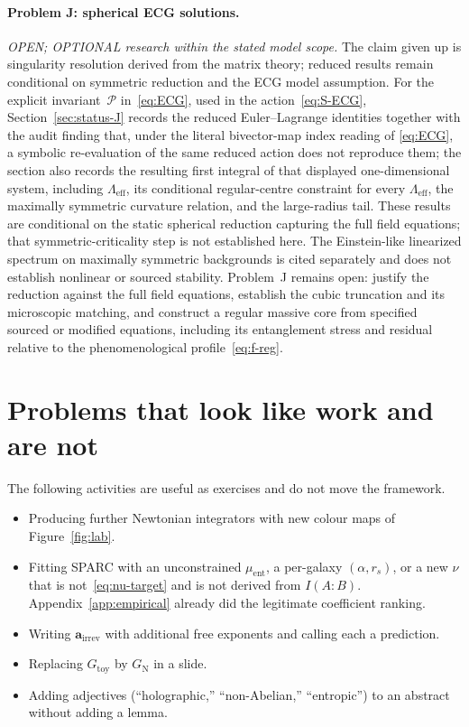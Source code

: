 \paragraph{Problem J: spherical ECG solutions.}
\emph{OPEN; OPTIONAL research within the stated model scope.} The
claim given up is singularity resolution derived from the matrix
theory; reduced results remain conditional on symmetric reduction
and the ECG model assumption.
For the explicit invariant~\(\mathcal P\) in~\eqref{eq:ECG}, used in
the action~\eqref{eq:S-ECG}, Section~\ref{sec:status-J} records the
reduced Euler--Lagrange identities together with the audit finding
that, under the literal bivector-map index reading of \eqref{eq:ECG},
a symbolic re-evaluation of the same reduced action does not
reproduce them; the section also records the resulting first integral
of that displayed one-dimensional system, including
\(\Lambda_{\mathrm{eff}}\), its conditional regular-centre constraint
for every \(\Lambda_{\mathrm{eff}}\), the maximally symmetric
curvature relation, and the large-radius tail. These results are
conditional on the static spherical reduction capturing the full
field equations; that symmetric-criticality step is not established
here. The Einstein-like linearized spectrum on maximally symmetric
backgrounds is cited separately and does not establish nonlinear or
sourced stability. Problem~J remains open: justify the reduction
against the full field equations, establish the cubic truncation and
its microscopic matching, and construct a regular massive core from
specified sourced or modified equations, including its entanglement
stress and residual relative to the phenomenological
profile~\eqref{eq:f-reg}.

\section{Problems that look like work and are not}
\label{sec:ch17-not}

The following activities are useful as exercises and do not move
the framework.

\begin{itemize}
  \item Producing further Newtonian integrators with new colour
        maps of Figure~\ref{fig:lab}.
  \item Fitting SPARC with an unconstrained \(\mu_{\mathrm{ent}}\),
        a per-galaxy \((\alpha,r_s)\), or a new \(\nu\) that is
        not~\eqref{eq:nu-target} and is not derived from
        \(I(A:B)\). Appendix~\ref{app:empirical} already did the
        legitimate coefficient ranking.
  \item Writing \(\mathbf{a}_{\mathrm{irrev}}\) with additional
        free exponents and calling each a prediction.
  \item Replacing \(G_{\mathrm{toy}}\) by \(G_{\mathrm{N}}\) in
        a slide.
  \item Adding adjectives (``holographic,'' ``non-Abelian,''
        ``entropic'') to an abstract without adding a lemma.
\end{itemize}

